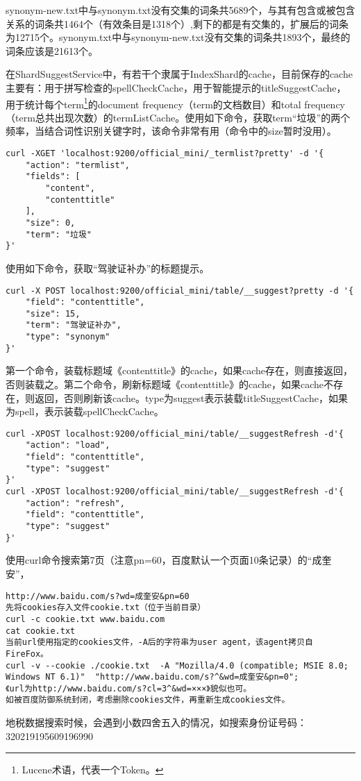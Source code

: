 \par synonym-new.txt中与synonym.txt没有交集的词条共5689个，与其有包含或被包含关系的词条共1464个（有效条目是1318个）,剩下的都是有交集的，扩展后的词条为12715个。synonym.txt中与synonym-new.txt没有交集的词条共1893个，最终的词条应该是21613个。
\par 在ShardSuggestService中，有若干个隶属于IndexShard的cache，目前保存的cache主要有：用于拼写检查的spellCheckCache，用于智能提示的titleSuggestCache，用于统计每个term\footnote{Lucene术语，代表一个Token。}的document frequency（term的文档数目）和total frequency（term总共出现次数）的termListCache。使用如下命令，获取term“垃圾”的两个频率，当结合词性识别关键字时，该命令非常有用（命令中的size暂时没用）。
\begin{verbatim}
curl -XGET 'localhost:9200/official_mini/_termlist?pretty' -d '{
    "action": "termlist", 
    "fields": [
        "content", 
        "contenttitle"
    ], 
    "size": 0, 
    "term": "垃圾"
}'
\end{verbatim}
\par 使用如下命令，获取“驾驶证补办”的标题提示。
\begin{verbatim}
curl -X POST localhost:9200/official_mini/table/__suggest?pretty -d '{
    "field": "contenttitle", 
    "size": 15, 
    "term": "驾驶证补办", 
    "type": "synonym"
}'
\end{verbatim}
\par 第一个命令，装载标题域《contenttitle》的cache，如果cache存在，则直接返回，否则装载之。第二个命令，刷新标题域《contenttitle》的cache，如果cache不存在，则返回，否则刷新该cache。type为suggest表示装载titleSuggestCache，如果为spell，表示装载spellCheckCache。
\begin{verbatim}
curl -XPOST localhost:9200/official_mini/table/__suggestRefresh -d'{
    "action": "load", 
    "field": "contenttitle", 
    "type": "suggest"
}'
curl -XPOST localhost:9200/official_mini/table/__suggestRefresh -d'{   
    "action": "refresh", 
    "field": "contenttitle", 
    "type": "suggest"
}'
\end{verbatim}
\par 使用curl命令搜索第7页（注意pn=60，百度默认一个页面10条记录）的“成奎安”，
\begin{verbatim}
http://www.baidu.com/s?wd=成奎安&pn=60
先将cookies存入文件cookie.txt（位于当前目录）
curl -c cookie.txt www.baidu.com
cat cookie.txt
当前url使用指定的cookies文件，-A后的字符串为user agent，该agent拷贝自FireFox。
curl -v --cookie ./cookie.txt  -A "Mozilla/4.0 (compatible; MSIE 8.0; Windows NT 6.1)"  "http://www.baidu.com/s?^&wd=成奎安&pn=0";
《url为http://www.baidu.com/s?cl=3^&wd=×××》貌似也可。
如被百度防御系统封闭，考虑删除cookies文件，再重新生成cookies文件。
\end{verbatim}

地税数据搜索时候，会遇到小数四舍五入的情况，如搜索身份证号码：
320219195609196990